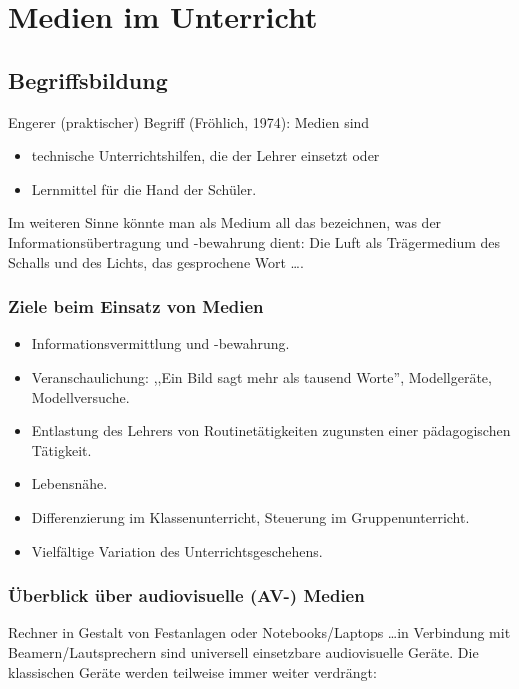\chapter{Medien im Unterricht}\label{Medien}

\section{Begriffsbildung}
Engerer (praktischer) Begriff (Fr\"{o}hlich, 1974): Medien sind
\begin{itemize}
\item
technische Unterrichtshilfen, die der Lehrer einsetzt oder
\item
Lernmittel f\"{u}r die Hand der Sch\"{u}ler.
\end{itemize}

Im weiteren Sinne k\"{o}nnte man als Medium all das bezeichnen, was der
Informations\"{u}bertragung und -bewahrung dient:
Die Luft als Tr\"{a}germedium
des Schalls und des Lichts, das gesprochene Wort \dots.

\subsection{Ziele beim Einsatz von Medien}
\begin{itemize}
\item
Informationsvermittlung und -bewahrung.
\item
Veranschaulichung: ,,Ein Bild sagt mehr als tausend Worte'',
Modellger\"{a}te, Modellversuche.
\item
Entlastung des Lehrers von Routine\-t\"{a}tigkeiten zugunsten einer
p\"{a}dagogischen T\"{a}tigkeit.
\item
Lebensn\"{a}he.
\item
Differenzierung im Klassenunterricht, Steuerung
im Gruppenunterricht.
\item
Vielf\"{a}ltige Variation des Unterrichtsgeschehens.
\end{itemize}

\subsection{\"{U}berblick \"{u}ber audiovisuelle (AV-) Medien}

Rechner in Gestalt von Festanlagen oder Notebooks/Laptops \dots in Verbindung mit Beamern/Lautsprechern
sind universell einsetzbare audiovisuelle Ger\"{a}te.
Die klassischen Ger\"{a}te werden teilweise immer weiter verdr\"{a}ngt:


